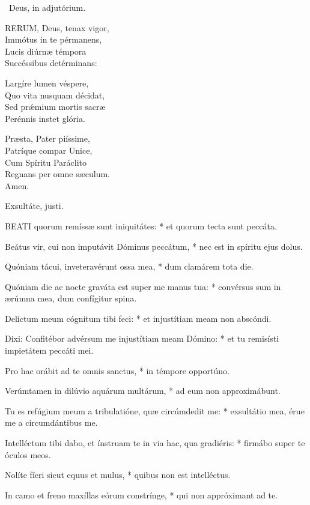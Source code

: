 \V\ Deus, in adjutórium.


\lettrine[lines=2]{R}{ERUM}, Deus, tenax vigor,\\
Immótus in te pérmanens,\\
Lucis diúrnæ témpora\\
Succéssibus detérminans:

Largíre lumen véspere,\\
Quo vita nusquam décidat,\\
Sed prǽmium mortis sacræ\\
Perénnis instet glória.

Præsta, Pater piíssime,\\
Patríque compar Unice,\\
Cum Spíritu Paráclito\\
Regnans per omne sæculum.\\
Amen.

 Exsultáte, justi.


\lettrine[lines=2]{B}{EATI} quorum remíssæ sunt iniquitátes: * et quorum tecta sunt peccáta.

Beátus vir, cui non imputávit Dóminus peccátum, * nec est in spíritu ejus dolus.

Quóniam tácui, inveteravérunt ossa mea, * dum clamárem tota die.

Quóniam die ac nocte graváta est super me manus tua: * convérsus sum in ærúmna mea, dum confígitur spina.

Delíctum meum cógnitum tibi feci: * et injustítiam meam non abscóndi.

Dixi: Confitébor advérsum me injustítiam meam Dómino: * et tu remisísti impietátem peccáti mei.

Pro hac orábit ad te omnis sanctus, * in témpore opportúno.

Verúmtamen in dilúvio aquárum multárum, * ad eum non approximábunt.

Tu es refúgium meum a tribulatióne, quæ circúmdedit me: * exsultátio mea, érue me a circumdántibus me.

Intelléctum tibi dabo, et ínstruam te in via hac, qua gradiéris: * firmábo super te óculos meos.

Nolíte fíeri sicut equus et mulus, * quibus non est intelléctus.

In camo et freno maxíllas eórum constrínge, * qui non appróximant ad te.

